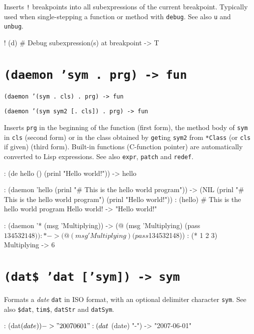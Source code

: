 Inserts \texttt{!} breakpoints into all subexpressions of the current
breakpoint. Typically used when single-stepping a function or method
with \texttt{debug}. See also \texttt{u} and \texttt{unbug}.


\begin{wideverbatim}
! (d)         # Debug subexpression(s) at breakpoint
-> T
\end{wideverbatim}

 
\section*{\texttt{(daemon 'sym . prg) -> fun}}
\label{sec:func-ref-D-(daemon 'sym . prg) -> fun}


\texttt{(daemon '(sym . cls) . prg) -> fun}

\texttt{(daemon '(sym sym2 [. cls]) . prg) -> fun}

Inserts \texttt{prg} in the beginning of the function (first form),
the method body of \texttt{sym} in \texttt{cls} (second form) or in
the class obtained by \texttt{get}ing \texttt{sym2} from
\texttt{*Class} (or \texttt{cls} if given) (third form). Built-in
functions (C-function pointer) are automatically converted to Lisp
expressions. See also \texttt{expr}, \texttt{patch} and
\texttt{redef}.


\begin{wideverbatim}
: (de hello () (prinl "Hello world!"))
-> hello

: (daemon 'hello (prinl "# This is the hello world program"))
-> (NIL (prinl "# This is the hello world program") (prinl "Hello world!"))
: (hello)
# This is the hello world program
Hello world!
-> "Hello world!"

: (daemon '* (msg 'Multiplying))
-> (@ (msg 'Multiplying) (pass $134532148))
: *
-> (@ (msg 'Multiplying) (pass $134532148))
: (* 1 2 3)
Multiplying
-> 6
\end{wideverbatim}

 
\section*{\texttt{(dat\$ 'dat ['sym]) -> sym}}
\label{sec:func-ref-D-dat}

Formats a \emph{date} \texttt{dat} in ISO format, with an optional
delimiter character \texttt{sym}. See also \texttt{\$dat},
\texttt{tim\$}, \texttt{datStr} and \texttt{datSym}.


\begin{wideverbatim}
: (dat$ (date))
-> "20070601"
: (dat$ (date) "-")
-> "2007-06-01"
\end{wideverbatim}

